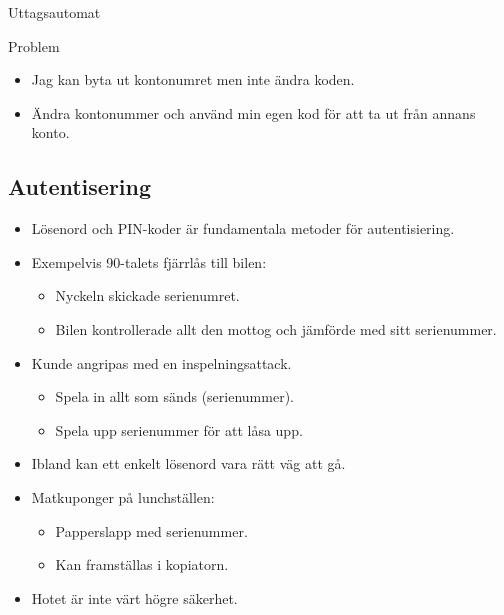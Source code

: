 \documentclass{beamer}
\theoremstyle{definition}
\theoremstyle{remark}
\begin{document}
\begin{frame}{\insertsubsectionhead}{Uttagsautomat}
  \begin{block}{Problem}
    \begin{itemize}
      \item Jag kan byta ut kontonumret men inte ändra koden.
      \item Ändra kontonummer och använd min egen kod för att ta ut från annans 
        konto.
    \end{itemize}
  \end{block}
\end{frame}

\subsection{Autentisering}

\begin{frame}{\insertsubsectionhead}
  \begin{itemize}
    \item Lösenord och PIN-koder är fundamentala metoder för autentisiering.

    \item Exempelvis 90-talets fjärrlås till bilen:
      \begin{itemize}
        \item Nyckeln skickade serienumret.
        \item Bilen kontrollerade allt den mottog och jämförde med sitt 
          serienummer.
      \end{itemize}

    \item Kunde angripas med en inspelningsattack.
      \begin{itemize}
        \item Spela in allt som sänds (serienummer).
        \item Spela upp serienummer för att låsa upp.
      \end{itemize}

  \end{itemize}
\end{frame}

\begin{frame}{\insertsubsectionhead}
  \begin{itemize}
    \item Ibland kan ett enkelt lösenord vara rätt väg att gå.

    \item Matkuponger på lunchställen:
      \begin{itemize}
        \item Papperslapp med serienummer.
        \item Kan framställas i kopiatorn.
      \end{itemize}

    \item Hotet är inte värt högre säkerhet.

  \end{itemize}
\end{frame}
\end{document}
